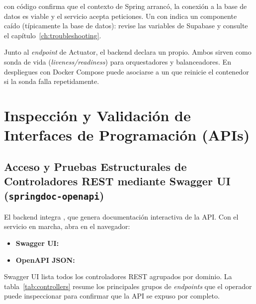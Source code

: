 \begin{VerificacionOK}
 con código  confirma que el contexto de Spring
arrancó, la conexión a la base de datos es viable y el servicio acepta peticiones. Un
 con  indica un componente caído (típicamente la
base de datos): revise las variables de Supabase y consulte el capítulo~\ref{ch:troubleshooting}.
\end{VerificacionOK}

\begin{NotaConfiguracion}
Junto al \textit{endpoint} de Actuator, el backend declara un 
propio. Ambos sirven como sonda de vida (\textit{liveness/readiness}) para orquestadores y
balanceadores. En despliegues con Docker Compose puede asociarse a un 
que reinicie el contenedor si la sonda falla repetidamente.
\end{NotaConfiguracion}

\section{Inspección y Validación de Interfaces de Programación (APIs)}%
\label{sec:apis}

\subsection[Inspección con Swagger UI]{Acceso y Pruebas Estructurales de Controladores REST mediante Swagger UI (\texttt{springdoc-openapi})}%
\label{subsec:swagger}

El backend integra , que genera documentación interactiva de la
API. Con el servicio en marcha, abra en el navegador:\par

\begin{itemize}[noitemsep]
    \item \textbf{Swagger UI:} 
    \item \textbf{OpenAPI JSON:} 
\end{itemize}

Swagger UI lista todos los controladores REST agrupados por dominio. La
tabla~\ref{tab:controllers} resume los principales grupos de \textit{endpoints} que el
operador puede inspeccionar para confirmar que la API se expuso por completo.\par

